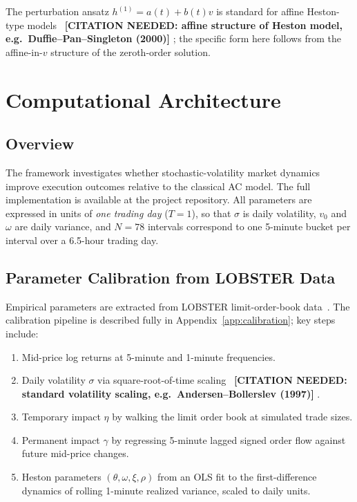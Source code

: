 \documentclass[11pt]{article}
\newcommand{\needscite}[1]{%
  {\color{red}\textbf{[CITATION NEEDED: #1]}}%
}
\begin{document}
The perturbation ansatz $h^{(1)} = a(t) + b(t)v$ is standard for affine Heston-type
models~\needscite{affine structure of Heston model, e.g.\ Duffie--Pan--Singleton (2000)};
the specific form here follows from the affine-in-$v$ structure of the zeroth-order
solution.

\section{Computational Architecture}

\subsection{Overview}

The framework investigates whether stochastic-volatility market dynamics improve execution
outcomes relative to the classical AC model. The full implementation is available at the
project repository. All parameters are expressed in units of \emph{one trading day} ($T=1$),
so that $\sigma$ is daily volatility, $v_0$ and $\omega$ are daily variance, and
$N = 78$ intervals correspond to one 5-minute bucket per interval over a 6.5-hour trading day.

\subsection{Parameter Calibration from LOBSTER Data}
\label{sec:calibration}

Empirical parameters are extracted from LOBSTER limit-order-book data~\cite{huang2011lobster}.
The calibration pipeline is described fully in Appendix~\ref{app:calibration}; key steps include:
\begin{enumerate}
\item Mid-price log returns at 5-minute and 1-minute frequencies.
\item Daily volatility $\sigma$ via square-root-of-time scaling~\needscite{standard volatility scaling, e.g.\ Andersen--Bollerslev (1997)}.
\item Temporary impact $\eta$ by walking the limit order book at simulated trade sizes.
\item Permanent impact $\gamma$ by regressing 5-minute lagged signed order flow against future mid-price changes.
\item Heston parameters $(\theta, \omega, \xi, \rho)$ from an OLS fit to the first-difference dynamics of rolling 1-minute realized variance, scaled to daily units.
\end{enumerate}
\end{document}
